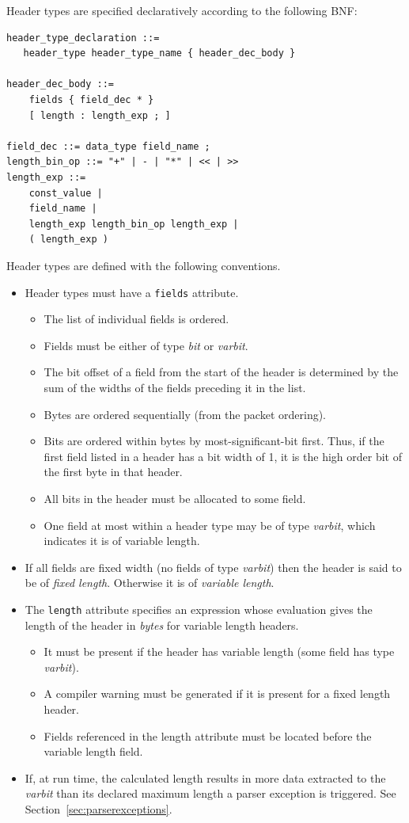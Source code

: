 \documentclass[12pt]{article}
\begin{document}
Header types are specified declaratively according to the following BNF:

\begin{lstlisting}[style=BNFstyle]
header_type_declaration ::= 
   header_type header_type_name { header_dec_body }

header_dec_body ::=
    fields { field_dec * }
    [ length : length_exp ; ]

field_dec ::= data_type field_name ;
length_bin_op ::= "+" | - | "*" | << | >>
length_exp ::=
    const_value |
    field_name |
    length_exp length_bin_op length_exp |
    ( length_exp )

\end{lstlisting}

Header types are defined with the following conventions.
\begin{itemize}
\item
Header types must have a \texttt{fields} attribute. 
\begin{itemize}
\item
The list of individual fields is ordered.
\item
Fields must be either of type \textit{bit} or \textit{varbit}.
\item
The bit offset of a field from the start of the header is determined by the 
sum of the widths of the fields preceding it in the list.
\item
Bytes are ordered sequentially (from the packet ordering).
\item
Bits are ordered within bytes by most-significant-bit first.  Thus, if the 
first field listed in a header has a bit width of 1, it is the high order 
bit of the first byte in that header.
\item
All bits in the header must be allocated to some field.
\item
One field at most within a header type may be of type \textit{varbit}, which 
indicates it is of variable length.
\end{itemize}

\item
If all fields are fixed width (no fields of type \textit{varbit}) then the header is 
said to be of \textit{fixed length}. Otherwise it is of \textit{variable length}.
\item
The \texttt{length} attribute specifies an expression whose evaluation gives
the length  of the header in \textit{bytes} for variable length headers. 
\begin{itemize}
\item
It must be present if the header has variable length (some field has type  
\textit{varbit}).
\item
A compiler warning must be generated if it is present for a fixed length header.
\item
Fields referenced in the length attribute must be located before the variable 
length field.
\end{itemize}
\item
If, at run time, the calculated length results in more data extracted to
the \textit{varbit} than its declared maximum length a parser exception is
triggered. See Section~\ref{sec:parserexceptions}.


\end{itemize}
\end{document}

